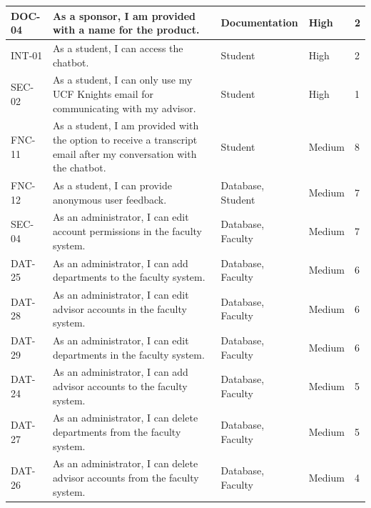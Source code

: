 \documentclass[titlepage, 12pt]{article}
\begin{document}
\begin{center}
\begin{longtable}{ L{1.5cm} L{4cm} L{3cm} L{1.5cm} L{1.5cm} }
\midrule
DOC-04 & As a sponsor, I am provided with a name for the product.                                                                          & Documentation         & High   & 2  \\
\midrule
INT-01 & As a student, I can access the chatbot.                                                                                           & Student               & High   & 2  \\
\midrule
SEC-02 & As a student, I can only use my UCF Knights email for communicating with my advisor.                                              & Student               & High   & 1  \\
\midrule
FNC-11 & As a student, I am provided with the option to receive a transcript email after my conversation with the chatbot.                 & Student               & Medium & 8  \\
\midrule
FNC-12 & As a student, I can provide anonymous user feedback.                                                                              & Database, Student     & Medium & 7  \\
\midrule
SEC-04 & As an administrator, I can edit account permissions in the faculty system.                                                        & Database, Faculty     & Medium & 7  \\
\midrule
DAT-25 & As an administrator, I can add departments to the faculty system.                                                                 & Database, Faculty     & Medium & 6  \\
\midrule
DAT-28 & As an administrator, I can edit advisor accounts in the faculty system.                                                           & Database, Faculty     & Medium & 6  \\
\midrule
DAT-29 & As an administrator, I can edit departments in the faculty system.                                                                & Database, Faculty     & Medium & 6  \\
\midrule
DAT-24 & As an administrator, I can add advisor accounts to the faculty system.                                                            & Database, Faculty     & Medium & 5  \\
\midrule
DAT-27 & As an administrator, I can delete departments from the faculty system.                                                            & Database, Faculty     & Medium & 5  \\
\midrule
DAT-26 & As an administrator, I can delete advisor accounts from the faculty system.                                                       & Database, Faculty     & Medium & 4  \\

\end{longtable}
\end{center}
\end{document}
